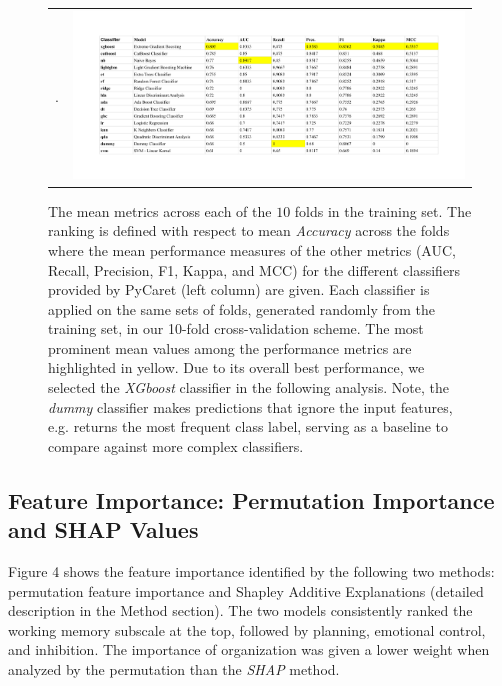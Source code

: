 \documentclass[jcm,article,submit,pdftex,moreauthors]{Definitions/mdpi}
\begin{document}
\begin{figure}[H]
\begin{tabular}{ll}
. \hspace{-18mm} & \includegraphics[width=16.0cm]
{Figs/BRIEF-IBS-Figs_compare_models.pdf}
\end{tabular}
\vspace{-8mm}
\caption{The mean metrics across each of the $10$ folds in the training set. The ranking is defined with respect to mean \textit{Accuracy} across the folds where the mean performance measures of the other metrics (AUC, Recall, Precision, F1, Kappa, and MCC) for the different classifiers provided by PyCaret (left column) are given. Each classifier is applied on the same sets of folds, generated randomly from the training set, in our 10-fold cross-validation scheme. The most prominent mean values among the performance metrics are highlighted in yellow. Due to its overall best performance, we selected the \textit{XGboost} classifier in the following analysis. Note, the \textit{dummy} classifier makes predictions that ignore the input features, e.g. returns the most frequent class label, serving as a baseline to compare against more complex classifiers.}
\end{figure}



\subsection{Feature Importance: Permutation Importance and SHAP Values}

Figure 4 shows the feature importance identified by the following two methods: permutation feature importance and Shapley Additive Explanations (detailed description in the Method section). 
The two models consistently ranked the working memory subscale at the top, followed by planning, emotional control, and inhibition. The importance of organization was given a lower weight when analyzed by the permutation than the \textit{SHAP} method. 
\end{document}
